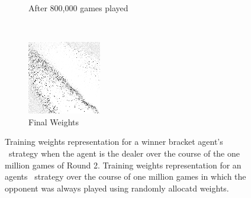 \begin{figure}
\begin{subfigure}[t]{0.3\textwidth}
	\caption{After 800,000 games played}
	\end{subfigure}
	~
	\begin{subfigure}[t]{0.3\textwidth}
	\includegraphics[width=\textwidth]{images/findings/round2/flipbook/random/checkpoint_999999.png}
	\caption{Final Weights}
	\end{subfigure}

\caption{
	Training weights representation for a winner bracket agent's \handmaxavg\
	strategy when the agent is the dealer
	over the course of the one million games of Round 2.
	Training weights representation for an agents \handmaxavg\ strategy
	over the course of one million games
	in which the opponent was always played using randomly allocatd weights.
}
\label{fig:r2-flip-random}
\end{figure}
